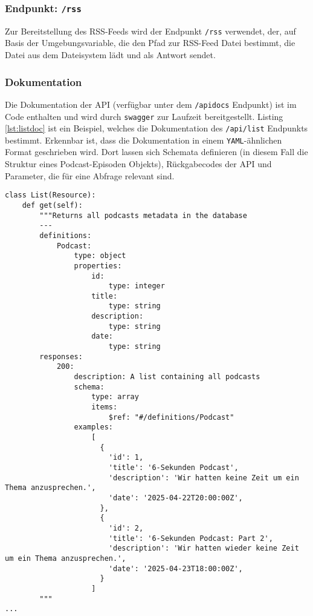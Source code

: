 \documentclass{article}
\begin{document}
\subsubsection{Endpunkt: \texttt{/rss}}
Zur Bereitstellung des RSS-Feeds wird der Endpunkt \texttt{/rss} verwendet, der, auf Basis der Umgebungsvariable, die den Pfad zur RSS-Feed Datei bestimmt, die Datei aus dem Dateisystem lädt und als Antwort sendet.

\subsubsection{Dokumentation}
Die Dokumentation der API (verfügbar unter dem \texttt{/apidocs} Endpunkt) ist im Code enthalten und wird durch \texttt{swagger} \cite{swagger} zur Laufzeit bereitgestellt. Listing \ref{lst:listdoc} ist ein Beispiel, welches die Dokumentation des \texttt{/api/list} Endpunkts bestimmt. Erkennbar ist, dass die Dokumentation in einem \texttt{YAML}-ähnlichen Format geschrieben wird. Dort lassen sich Schemata definieren (in diesem Fall die Struktur eines Podcast-Episoden Objekts), Rückgabecodes der API und Parameter, die für eine Abfrage relevant sind.

\begin{lstlisting}[label=lst:listdoc, caption=Dokumentationskommentar des \texttt{/api/list} Endpunkts]
class List(Resource):
    def get(self):
        """Returns all podcasts metadata in the database
        ---
        definitions:
            Podcast:
                type: object
                properties:
                    id:
                        type: integer
                    title:
                        type: string
                    description:
                        type: string
                    date:
                        type: string
        responses:
            200:
                description: A list containing all podcasts
                schema:
                    type: array
                    items:
                        $ref: "#/definitions/Podcast"
                examples:
                    [
                      {
                        'id': 1,
                        'title': '6-Sekunden Podcast',
                        'description': 'Wir hatten keine Zeit um ein Thema anzusprechen.',
                        'date': '2025-04-22T20:00:00Z',
                      },
                      {
                        'id': 2,
                        'title': '6-Sekunden Podcast: Part 2',
                        'description': 'Wir hatten wieder keine Zeit um ein Thema anzusprechen.',
                        'date': '2025-04-23T18:00:00Z',
                      }
                    ]
        """
...
\end{lstlisting}
\end{document}
